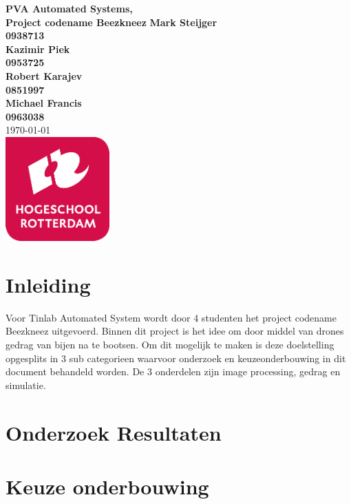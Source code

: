 \documentclass{article}
\begin{document}
\sffamily
\begin{titlepage}
  \centering
    \vfill
    {\bfseries\Huge
      PVA Automated Systems, \\
      Project codename Beezkneez
        \vskip2cm
      }
      {\bfseries\Large
        Mark Steijger\\
      }
      {
        \bfseries\normalsize
        0938713\\
            \vskip1cm
    }
          {\bfseries\Large
        Kazimir Piek\\
      }
      {
        \bfseries\normalsize
        0953725\\
            \vskip1cm
    }      {\bfseries\Large
        Robert Karajev\\
      }
      {
        \bfseries\normalsize
        0851997\\
            \vskip1cm
    }      {\bfseries\Large
        Michael Francis\\
      }
      {
        \bfseries\normalsize
        0963038\\
            \vskip1cm
    }
            \vskip1cm
        \today\\
    \vfill
    \includegraphics[width=4cm]{logohr.png} %
    \vfill
    \vfill
\end{titlepage}
\newpage
\tableofcontents

\newpage
\section{Inleiding}
Voor Tinlab Automated System wordt door 4 studenten het project codename Beezkneez uitgevoerd. Binnen dit project is het idee om door middel
van drones gedrag van bijen na te bootsen. Om dit mogelijk te maken is deze doelstelling opgesplits in 3 sub categorieen waarvoor
onderzoek en keuzeonderbouwing in dit document behandeld worden. De 3 onderdelen zijn image processing, gedrag en simulatie.

\newpage
\section{Onderzoek Resultaten}




\newpage
\section{Keuze onderbouwing}





\newpage


\end{document}
